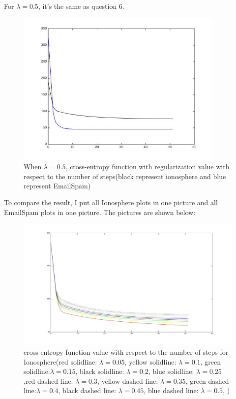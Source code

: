 \documentclass[11pt]{article}
\numberwithin{equation}{section}
\begin{document}
	For $\lambda = 0.5$, it's the same as question 6.
	\begin{figure} [H]
    	\centering 
    	\includegraphics[width=4in]{Q705} 
    	\caption{When $\lambda = 0.5$, cross-entropy function with regularization value with respect to 	the number of steps(black represent ionosphere and blue represent EmailSpam)} 
    	\label{fig:side:a} 
	\end{figure}

	To compare the result, I put all Ionosphere plots in one picture and all EmailSpam plots in one picture. The pictures are shown below:
	
	\begin{figure} [H] 
    	\includegraphics[width=6in]{Q7} 
    	\caption{ cross-entropy function  value with respect to the number of steps for Ionosphere(red solidline: $\lambda = 0.05$, yellow solidline: $\lambda = 0.1$, green solidline:$\lambda = 0.15$, black solidline: $\lambda = 0.2$, blue solidline: $\lambda = 0.25$,red dashed line: $\lambda = 0.3$, yellow dashed line: $\lambda = 0.35$, green dashed line:$\lambda = 0.4$, black dashed line: $\lambda = 0.45$, blue dashed line: $\lambda = 0.5$, )} 
    	\label{fig:side:a} 
	\end{figure}
	
\end{document}
